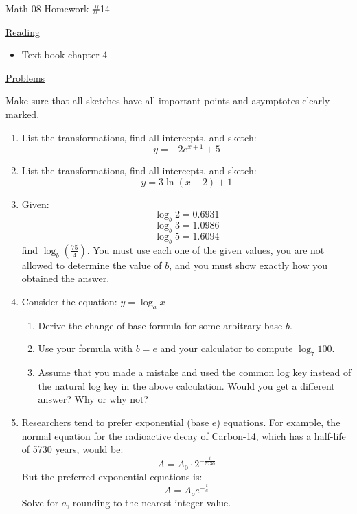 \documentclass[letterpaper,12pt,fleqn]{article}
\begin{document}
\begin{center}
\Large Math-08 Homework \#14
\end{center}

\vspace{0.5in}

\underline{Reading}

\begin{itemize}
\item Text book chapter 4
\end{itemize}

\underline{Problems}

Make sure that all sketches have all important points and asymptotes
clearly marked.

\begin{enumerate}
\item List the transformations, find all intercepts, and sketch:
  \[y=-2e^{x+1}+5\]
  
\item List the transformations, find all intercepts, and sketch:
  \[y=3\ln(x-2)+1\]

\item Given:
  \[\log_b{2}=0.6931\]
  \[\log_b{3}=1.0986\]
  \[\log_b{5}=1.6094\]
  find $\log_b{\left(\frac{75}{4}\right)}$. You must use each one of the given
  values, you are not allowed to determine the value of $b$, and you must show
  exactly how you obtained the answer.

\item Consider the equation: $y=\log_a{x}$
  \begin{enumerate}
  \item Derive the change of base formula for some arbitrary base $b$.
  \item Use your formula with $b=e$ and your calculator to compute
    $\log_7 100$.
  \item Assume that you made a mistake and used the common log key instead of
    the natural log key in the above calculation. Would you get a different
    answer? Why or why not?
  \end{enumerate}

\item Researchers tend to prefer exponential (base $e$) equations. For example,
  the normal equation for the radioactive decay of Carbon-14, which has a
  half-life of 5730 years, would be:
  \[A=A_0\cdot2^{-\frac{t}{5730}}\]
  But the preferred exponential equations is:
  \[A=A_oe^{-\frac{t}{a}}\]
  Solve for $a$, rounding to the nearest integer value.
\end{enumerate}
\end{document}
